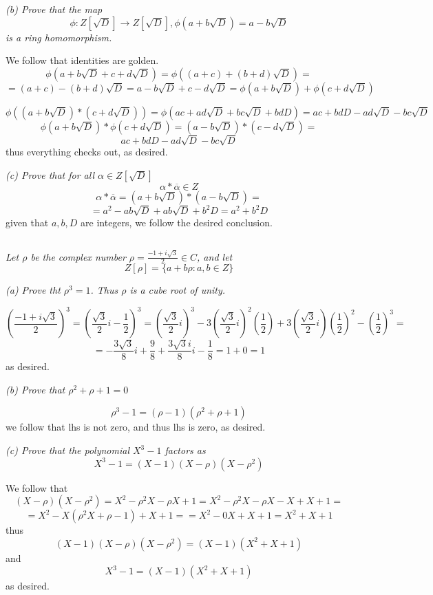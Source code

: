 \documentclass[11pt,oneside,titlepage]{book}
\newcommand{\set}[1]{\{ #1 \}}
\begin{document}
\textit{(b) Prove that the map
  $$\phi: Z[\sqrt{D}] \to Z[\sqrt{D}], \phi(a + b\sqrt{D}) = a - b \sqrt{D}$$
  is a ring homomorphism. }

We follow that identities are golden.
$$\phi(a + b\sqrt{D} + c + d\sqrt{D}) =  \phi((a + c) + (b + d)\sqrt{D}) = $$
$$ = 
(a + c) - (b + d)\sqrt{D} = a - b\sqrt{D} + c - d\sqrt{D} = \phi(a + b\sqrt{D}) + \phi(c + d\sqrt{D})$$

$$\phi((a + b\sqrt{D}) * (c + d\sqrt{D})) = \phi(ac + ad\sqrt{D} + bc\sqrt{D} + bdD) =
ac + bdD - ad\sqrt{D} - bc\sqrt{D}$$
$$\phi(a + b\sqrt{D}) * \phi(c + d\sqrt{D}) = (a - b\sqrt{D}) * (c - d \sqrt{D}) = $$
$$ ac  + bdD  - ad\sqrt{D} - bc\sqrt{D}$$
thus everything checks out, as desired.

\textit{(c) Prove that for all $\alpha \in Z[\sqrt{D}]$
  $$\alpha *  \overline{\alpha} \in Z$$}
$$\alpha *  \overline{\alpha} = (a + b\sqrt{D}) * (a - b\sqrt{D}) = $$
$$ = a^2 - ab\sqrt{D} + ab\sqrt{D} + b^2D = a^2 + b^2D$$
given that $a, b, D$ are integers, we follow the desired conclusion.

\subsection{}

\textit{Let $\rho$ be the complex number $\rho = \frac{-1 + i\sqrt{3}}{2} \in C$, and let
  $$Z[\rho] = \set{a + b\rho: a, b \in Z}$$}

\textit{(a) Prove tht $\rho^3 = 1$. Thus $\rho$ is a cube root of unity.}

$$\left(\frac{-1 + i\sqrt{3}}{2}\right)^3 =
\left(\frac{\sqrt{3}}{2} i - \frac{1}{2}\right)^3 =
\left(\frac{\sqrt{3}}{2} i \right)^3 -
3 \left(\frac{\sqrt{3}}{2} i \right)^2 \left(\frac{1}{2} \right) +
3 \left(\frac{\sqrt{3}}{2} i \right) \left(\frac{1}{2}\right)^2 -
\left(\frac{1}{2}\right)^3 = $$
$$ = - \frac{3 \sqrt{3}}{8} i  + \frac{9}{8} + \frac{3 \sqrt{3} i}{8}i  - \frac{1}{8} =
1 + 0 = 1$$
as desired.

\textit{(b) Prove that $\rho^2 + \rho + 1 = 0$}

$$\rho^3 - 1 = (\rho - 1)(\rho^2 + \rho + 1)$$
we follow that lhs is not zero, and thus lhs is zero, as desired.

\textit{(c) Prove that the polynomial $X^3 - 1$ factors as
  $$X^3 - 1 = (X - 1)(X - \rho)(X - \rho^2)$$}


We follow that
$$(X - \rho) (X - \rho^2) = X^2 - \rho^2 X - \rho X + 1 = X^2 - \rho^2 X - \rho X - X + X + 1 =$$
$$ = X^2 - X(\rho^2 X+ \rho - 1) + X + 1 = = X^2 - 0X + X + 1 = X^2 + X + 1$$
thus
$$(X - 1) (X - \rho) (X - \rho^2)  = (X - 1) (X^2 + X + 1)$$
and
$$X^3 - 1 = (X - 1)(X^2 + X + 1)$$
as desired.
\end{document}
